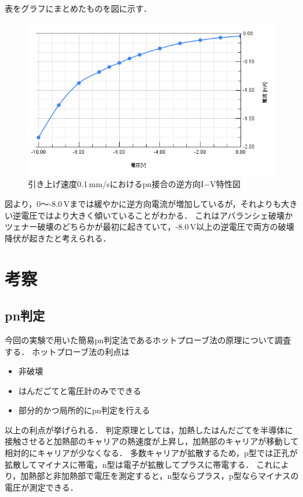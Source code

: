 \documentclass[11pt]{jarticle}
\begin{document}
		表をグラフにまとめたものを図に示す．
		\begin{figure}[H]
		\centering
		\includegraphics[width = 12cm]{figs/chart6.png}
		\caption{引き上げ速度0.1\,mm/sにおけるpn接合の逆方向I−V特性図}
		\label{fig:pngyaku0.1}
		\end{figure}
		図より，0～-8.0\,Vまでは緩やかに逆方向電流が増加しているが，それよりも大きい逆電圧ではより大きく傾いていることがわかる．
		これはアバランシェ破壊かツェナー破壊のどちらかが最初に起きていて，-8.0\,V以上の逆電圧で両方の破壊降伏が起きたと考えられる．

\section{考察}
	\subsection{pn判定}
		今回の実験で用いた簡易pn判定法であるホットプローブ法の原理について調査する．
		ホットプローブ法の利点は
		\begin{itemize}
			\item 非破壊
			\item はんだごてと電圧計のみでできる
			\item 部分的かつ局所的にpn判定を行える
		\end{itemize}
		以上の利点が挙げられる．
		判定原理としては，加熱したはんだごてを半導体に接触させると加熱部のキャリアの熱速度が上昇し，加熱部のキャリアが移動して相対的にキャリアが少なくなる．
		多数キャリアが拡散するため，p型では正孔が拡散してマイナスに帯電，n型は電子が拡散してプラスに帯電する．
		これにより，加熱部と非加熱部で電圧を測定すると，n型ならプラス，p型ならマイナスの電圧が測定できる．
\end{document}
